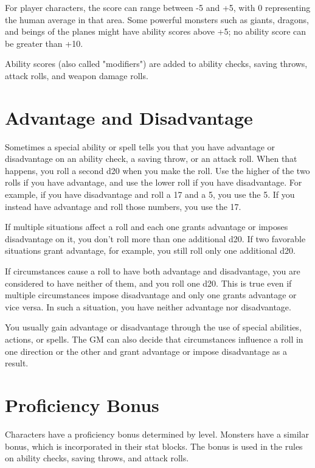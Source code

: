 For player characters, the score can range between -5 and +5, with 0 representing the human average in that area. Some powerful monsters such as giants, dragons, and beings of the planes might have ability scores above +5; no ability score can be greater than +10.

Ability scores (also called "modifiers") are added to ability checks, saving throws, attack rolls, and weapon damage rolls.

\section{Advantage and Disadvantage} \label{sec:advantage-and-disadvantage}

Sometimes a special ability or spell tells you that you have advantage or disadvantage on an ability check, a saving throw, or an attack roll. When that happens, you roll a second d20 when you make the roll. Use the higher of the two rolls if you have advantage, and use the lower roll if you have disadvantage. For example, if you have disadvantage and roll a 17 and a 5, you use the 5. If you instead have advantage and roll those numbers, you use the 17.

If multiple situations affect a roll and each one grants advantage or imposes disadvantage on it, you don't roll more than one additional d20. If two favorable situations grant advantage, for example, you still roll only one additional d20.

If circumstances cause a roll to have both advantage and disadvantage, you are considered to have neither of them, and you roll one d20. This is true even if multiple circumstances impose disadvantage and only one grants advantage or vice versa. In such a situation, you have neither advantage nor disadvantage.

You usually gain advantage or disadvantage through the use of special abilities, actions, or spells. The GM can also decide that circumstances influence a roll in one direction or the other and grant advantage or impose disadvantage as a result.

\section{Proficiency Bonus}

Characters have a proficiency bonus determined by level. Monsters have a similar bonus, which is incorporated in their stat blocks. The bonus is used in the rules on ability checks, saving throws, and attack rolls.

